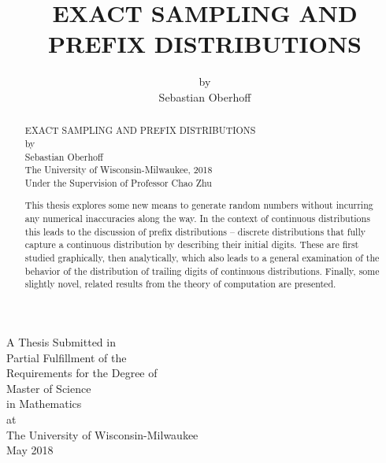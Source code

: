 \documentclass{article}
\title{\vspace{-1cm}EXACT SAMPLING AND PREFIX DISTRIBUTIONS}
\author{by\\Sebastian Oberhoff}
\date{}
\begin{document}
\maketitle
\vspace{2cm}
\begin{center}
\doublespacing
A Thesis Submitted in\\
Partial Fulfillment of the\\
Requirements for the Degree of\\[2em]
Master of Science\\
in Mathematics\\[2em]
at\\
The University of Wisconsin-Milwaukee\\
May 2018
\end{center}

\thispagestyle{empty}

\newpage

\setcounter{page}{2}

\renewcommand\abstractname{\textsc{ABSTRACT}}
\begin{abstract}
\begin{center}
EXACT SAMPLING AND PREFIX DISTRIBUTIONS\\[0.5em]
by\\[0.5em]
Sebastian Oberhoff\\[0.5em]
The University of Wisconsin-Milwaukee, 2018\\
Under the Supervision of Professor Chao Zhu\\[0.5em]
\end{center}
\doublespacing
This thesis explores some new means to generate random numbers without incurring any numerical inaccuracies along the way. In the context of continuous distributions this leads to the discussion of prefix distributions -- discrete distributions that fully capture a continuous distribution by describing their initial digits. These are first studied graphically, then analytically, which also leads to a general examination of the behavior of the distribution of trailing digits of continuous distributions. Finally, some slightly novel, related results from the theory of computation are presented.
\end{abstract}

\newpage

\renewcommand{\contentsname}{\begin{center}TABLE OF CONTENTS\end{center}}
\tableofcontents
\end{document}
